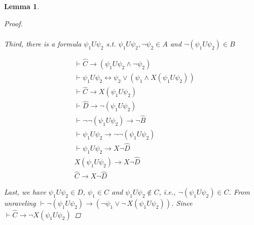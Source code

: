 \documentclass[11pt]{article}
\newtheorem{lemma}[theorem]{Lemma}
\theoremstyle{definition}
\theoremstyle{remark}
\begin{document}
\begin{lemma}
\begin{proof}
\[\begin{array}{rll}
            \end{array}
        \]

        Third, there is a formula $\psi_1 U \psi_2$ s.t. $\psi_1 U \psi_2, \neg \psi_2 \in A$ and $\neg(\psi_1 U \psi_2) \in B$

                        \[
            \begin{array}{rll} 
                    &  \vdash \hat{C} \rightarrow (\psi_1 U \psi_2 \land \neg \psi_2) \\
                    &  \vdash  \psi_1 U \psi_2 \leftrightarrow \psi_2 \lor (\psi_1 \land X(\psi_1 U \psi_2)) \\
                    &  \vdash \hat{C} \rightarrow X (\psi_1 U \psi_2) \\
                    &  \vdash \hat{D} \rightarrow \neg (\psi_1 U \psi_2) \\
                    &  \vdash \neg \neg (\psi_1 U \psi_2) \rightarrow \neg \hat{B} \\
                    &  \vdash \psi_1 U \psi_2 \rightarrow \neg \neg (\psi_1 U \psi_2) \\
                    &  \vdash \psi_1 U \psi_2 \rightarrow X \neg \hat{D} \\
                    &  X (\psi_1 U \psi_2) \rightarrow X \neg \hat{D} \\
                    &  \hat{C} \rightarrow X \neg \hat{D}


            \end{array}
        \]

        Last, we have $\psi_1 U \psi_2 \in D$, $\psi_1 \in C$ and $\psi_1 U \psi_2 \notin C$, i.e., $\neg(\psi_1 U \psi_2) \in C$.
        From unraveling $\vdash \neg(\psi_1 U \psi_2) \rightarrow (\neg \psi_1 \lor \neg \, X(\psi_1 U \psi_2))$. Since $\vdash \hat{C} \rightarrow \neg X(\psi_1 U \psi_2)$
    \end{proof}
\end{lemma}
\end{document}
